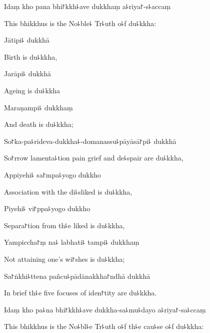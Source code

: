 Idaṃ kho pana bhi꜓kkh꜕ave dukkhaṃ a꜕riya꜓-s꜕accaṃ

\begin{english}
  This bhikkhus is the No꜕ble꜕ Tr꜕uth o꜕f du꜕kkha:
\end{english}

Jātipi꜕ dukkhā

\begin{english}
  Birth is du꜕kkha,
\end{english}

Jarāpi꜕ dukkhā

\begin{english}
  Ageing is du꜕kkha
\end{english}

Maraṇampi꜕ dukkhaṃ

\begin{english}
  And death is du꜕kkha;
\end{english}

So꜓ka-pa꜕rideva-dukkha꜕-domanassu꜕pāyāsā꜓pi꜕ dukkhā

\begin{english}
  So꜓rrow lamenta꜕tion pain grief and de꜕spair are du꜕kkha,
\end{english}

Appiyehi꜕ sa꜓mpa꜕yogo dukkho

\begin{english}
  Association with the di꜕sliked is du꜕kkha,
\end{english}

Piyehi꜕ vi꜓ppa꜕yogo dukkho

\begin{english}
  Separa꜓tion from th꜕e liked is du꜕kkha,
\end{english}

Yampiccha꜓ṃ na꜕ labhati꜕ tampi꜕ dukkhaṃ

\begin{english}
  Not attaining one's wi꜓shes is du꜕kkha;
\end{english}

Sa꜓ṅkhi꜕ttena pañcu꜕pādānakkha꜓ndhā dukkhā

\begin{english}
  In brief th꜕e five focuses of iden꜓tity are du꜕kkha.
\end{english}

Idaṃ kho pa꜕na bhi꜓kkh꜕ave dukkha-sa꜕mu꜕dayo a꜕riya꜓-sa꜕ccaṃ

\begin{english}
  This bhikkhus is the No꜕bl꜕e Tr꜕uth o꜕f th꜕e cau꜕se o꜕f du꜕kkha:
\end{english}

